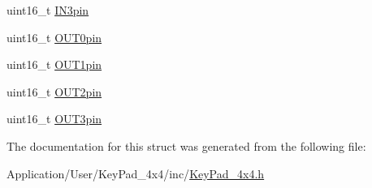 \begin{DoxyCompactItemize}
\item 
uint16\+\_\+t \hyperlink{group___key_pad___functions_ga3a5097701246b81b3156baf4a6e3fb5e}{I\+N3pin}
\item 
uint16\+\_\+t \hyperlink{group___key_pad___functions_gad84304a16a91fb587c994c959c30a39b}{O\+U\+T0pin}
\item 
uint16\+\_\+t \hyperlink{group___key_pad___functions_ga49549ddf83137d8740537712453723ae}{O\+U\+T1pin}
\item 
uint16\+\_\+t \hyperlink{group___key_pad___functions_ga376bc841372e03e107799eadf13cde51}{O\+U\+T2pin}
\item 
uint16\+\_\+t \hyperlink{group___key_pad___functions_gaaaa4c6e2944f027f8c7eb8d8bc0ee90c}{O\+U\+T3pin}
\end{DoxyCompactItemize}


The documentation for this struct was generated from the following file\+:\begin{DoxyCompactItemize}
\item 
Application/\+User/\+Key\+Pad\+\_\+4x4/inc/\hyperlink{_key_pad__4x4_8h}{Key\+Pad\+\_\+4x4.\+h}\end{DoxyCompactItemize}
